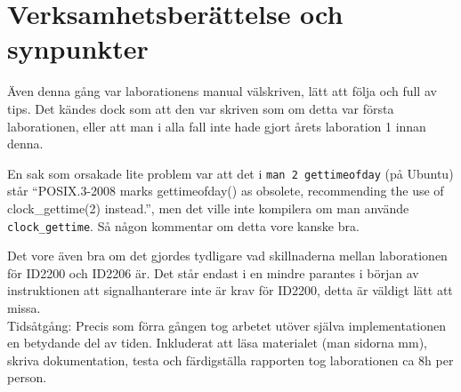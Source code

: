 \documentclass[a4paper]{article}
\begin{document}
\section*{Verksamhetsberättelse och synpunkter}
Även denna gång var laborationens manual välskriven, lätt att följa och full av tips. Det kändes dock som att den var skriven som om detta var första laborationen, eller att man i alla fall inte hade gjort årets laboration 1 innan denna.

En sak som orsakade lite problem var att det i \texttt{man 2 gettimeofday} (på Ubuntu) står ``POSIX.3-2008 marks gettimeofday() as obsolete, recommending the use of clock\_gettime(2) instead.'', men det ville inte kompilera om man använde \texttt{clock\_gettime}. Så någon kommentar om detta vore kanske bra.

Det vore även bra om det gjordes tydligare vad skillnaderna mellan laborationen för ID2200 och ID2206 är. Det står endast i en mindre parantes i början av instruktionen att signalhanterare inte är krav för ID2200, detta är väldigt lätt att missa.
\\
Tidsåtgång: Precis som förra gången tog arbetet utöver själva implementationen en betydande del av tiden. Inkluderat att läsa materialet (man sidorna mm), skriva dokumentation, testa och färdigställa rapporten tog laborationen ca 8h per person.
\end{document}
